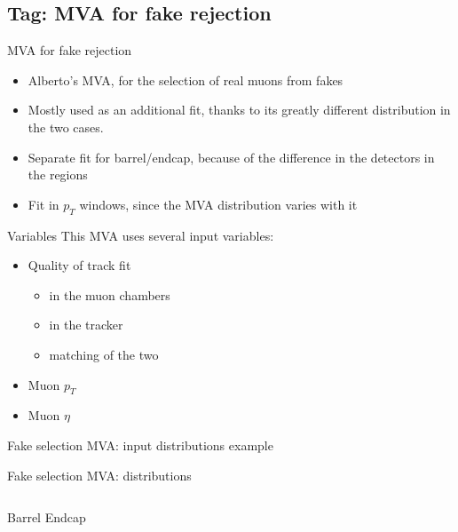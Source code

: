 \subsection{Tag: MVA for fake rejection}

\begin{frame}{MVA for fake rejection}
	\begin{block}{}
		\begin{itemize}
			\item Alberto's MVA, for the selection of real muons from fakes
			\item Mostly used as an additional fit, thanks to its greatly different distribution in the two cases.
			\item Separate fit for barrel/endcap, because of the difference in the detectors in the regions
			\item Fit in $p_T$ windows, since the MVA distribution varies with it
		\end{itemize}
	\end{block}
	\begin{block}{Variables}
		This MVA uses several input variables:
			\begin{itemize}
				\item Quality of track fit
					\begin{itemize}
						\item in the muon chambers
						\item in the tracker
						\item matching of the two
					\end{itemize}
				\item Muon $p_T$
				\item Muon $\eta$
			\end{itemize}
	\end{block}
\end{frame}

\begin{frame}{Fake selection MVA: input distributions example}
\end{frame}

\begin{frame}{Fake selection MVA: distributions}
	\begin{columns}
			\centering
			Barrel
			\centering
			Endcap
	\end{columns}
\end{frame}

